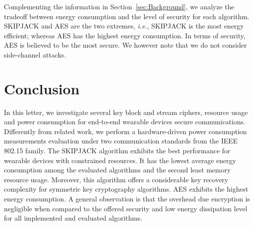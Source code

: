 \documentclass[journal]{IEEEtran}
\newcommand{\rever}[1]{{\color{blue}{[#1]}}}
\begin{document}
Complementing the information in Section~\ref{sec:Background}, we analyze the tradeoff between energy consumption and the level of security for each algorithm. SKIPJACK and AES are the two extremes, {\em i.e.}, SKIPJACK is the most energy efficient; whereas AES has the highest energy consumption. In terms of security, AES is believed to be the most secure. We however note that we do not consider side-channel attacks.


\vspace{-0.3cm}

\section{Conclusion}
\label{sec:Conclusion}
%

In this letter, we investigate several key block and stream ciphers, resource usage and power consumption for end-to-end wearable devices secure communications. Differently from related work, we perform a hardware-driven power consumption measurements evaluation under two communication standards from the IEEE 802.15 family. The SKIPJACK algorithm exhibits the best performance for wearable devices with constrained resources. It has the lowest average energy consumption among the  evaluated algorithms and the second least memory resource usage. Moreover, this algorithm offers a considerable key recovery complexity for symmetric key cryptography algorithms. AES exhibits the highest energy consumption. %
A general observation is that the overhead due encryption is negligible when compared to the offered security and low energy dissipation level for all implemented and evaluated algorithms.

\vspace{-0.5cm}



\end{document}
